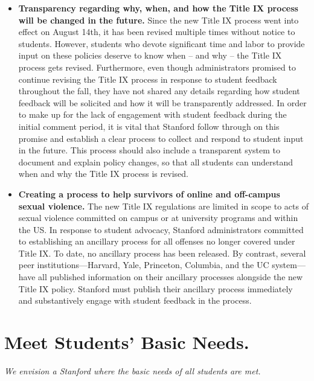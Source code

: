 \documentclass[12pt, titlepage, letterpaper]{article}
\begin{document}
\begin{itemize}[itemsep=1em]
    \item \textbf{Transparency regarding why, when, and how the Title IX process will be changed in the future.} Since the new Title IX process went into effect on August 14th, it has been revised multiple times without notice to students. However, students who devote significant time and labor to provide input on these policies deserve to know when – and why – the Title IX process gets revised. Furthermore, even though administrators promised to continue revising the Title IX process in response to student feedback throughout the fall, they have not shared any details regarding how student feedback will be solicited and how it will be transparently addressed. In order to make up for the lack of engagement with student feedback during the initial comment period, it is vital that Stanford follow through on this promise and establish a clear process to collect and respond to student input in the future. This process should also include a transparent system to document and explain policy changes, so that all students can understand when and why the Title IX process is revised.

    \item \textbf{Creating a process to help survivors of online and off-campus sexual violence.} The new Title IX regulations are limited in scope to acts of sexual violence committed on campus or at university programs and within the US. In response to student advocacy, Stanford administrators committed to establishing an ancillary process for all offenses no longer covered under Title IX. To date, no ancillary process has been released. By contrast, several peer institutions---Harvard, Yale, Princeton, Columbia, and the UC system---have all published information on their ancillary processes alongside the new Title IX policy. Stanford must publish their ancillary process immediately and substantively engage with student feedback in the process.
    
\end{itemize}

\newpage
\section*{Meet Students' Basic Needs.}
%
\vspace{0.5 em}\hline\hline

\textit{We envision a Stanford where the basic needs of all students are met. 
}
\end{document}
